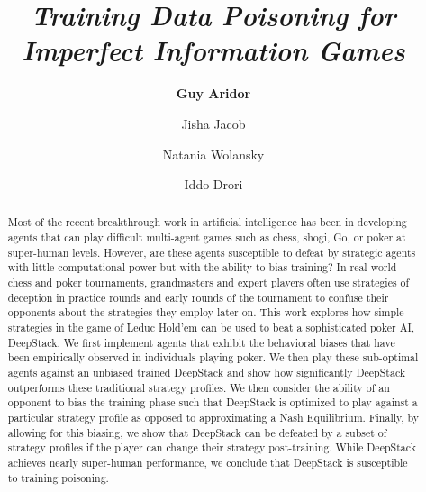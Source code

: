 \documentclass[10pt]{article}
\begin{document}
\begin{titlepage}
\title{\textbf{\textit{Training Data Poisoning for Imperfect Information Games}}}

\author[1]{\small \textbf{Guy Aridor}}
\author[2]{\small Jisha Jacob}
\author[2]{\small Natania Wolansky}
\author[2]{\small Iddo Drori}


\date{}
\maketitle
\begin{abstract}
\noindent Most of the recent breakthrough work in artificial intelligence has been in developing agents that can play difficult multi-agent games such as chess, shogi, Go, or poker at super-human levels. However, are these agents susceptible to defeat by strategic agents with little computational power but with the ability to bias training? In real world chess and poker tournaments, grandmasters and expert players often use strategies of deception in practice rounds and early rounds of the tournament to confuse their opponents about the strategies they employ later on. This work explores how simple strategies in the game of Leduc Hold’em can be used to beat a sophisticated poker AI, DeepStack. We first implement agents that exhibit the behavioral biases that have been empirically observed in individuals playing poker. We then play these sub-optimal agents against an unbiased trained DeepStack and show how significantly DeepStack outperforms these traditional strategy profiles. We then consider the ability of an opponent to bias the training phase such that DeepStack is optimized to play against a particular strategy profile as opposed to approximating a Nash Equilibrium. Finally, by allowing for this biasing, we show that DeepStack can be defeated by a subset of strategy profiles if the player can change their strategy post-training. While DeepStack achieves nearly super-human performance, we conclude that DeepStack is susceptible to training poisoning.
\\
\vspace{0in}\\
\vspace{0in}\\

\bigskip
\end{abstract}
\setcounter{page}{0}
\thispagestyle{empty}
\end{titlepage}
\end{document}
